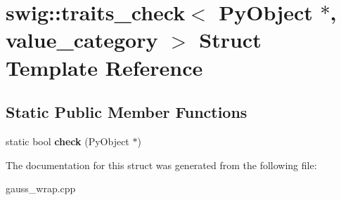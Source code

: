 \hypertarget{structswig_1_1traits__check_3_01_py_object_01_5_00_01value__category_01_4}{\section{swig\-:\-:traits\-\_\-check$<$ Py\-Object $\ast$, value\-\_\-category $>$ Struct Template Reference}
\label{structswig_1_1traits__check_3_01_py_object_01_5_00_01value__category_01_4}
}
\subsection*{Static Public Member Functions}
\begin{DoxyCompactItemize}
\item 
\hypertarget{structswig_1_1traits__check_3_01_py_object_01_5_00_01value__category_01_4_a4242a4f3371216574fd46f69b5fa0a23}{static bool {\bfseries check} (Py\-Object $\ast$)}\label{structswig_1_1traits__check_3_01_py_object_01_5_00_01value__category_01_4_a4242a4f3371216574fd46f69b5fa0a23}

\end{DoxyCompactItemize}


The documentation for this struct was generated from the following file\-:\begin{DoxyCompactItemize}
\item 
gauss\-\_\-wrap.\-cpp\end{DoxyCompactItemize}
